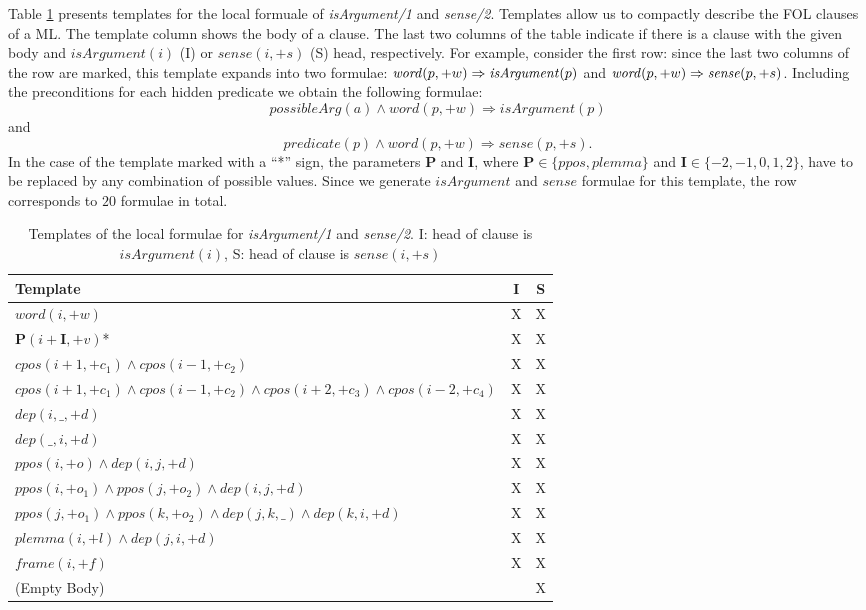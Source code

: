 Table \ref{tbl:f1} presents templates for the local formuale of 
\emph{isArgument/1} and \emph{sense/2}. Templates allow us to compactly describe the 
FOL clauses of a ML. The template column shows the body of a clause. The last two columns of the table indicate if there is a clause with the given body and $isArgument(i)$ (I) or  $sense(i,+s)$ (S) head, respectively. For example, consider the first row: 
since the last two columns of the row are marked, this template expands into two 
formulae:
$\mathit{word}(p,+w) \Rightarrow \mathit{isArgument}(p)$ and $\mathit{word}(p,+w) \Rightarrow \mathit{sense}(p,+s)$.  
Including the preconditions for each hidden predicate we obtain the following 
formulae:
\[\mathit{possibleArg}(a) \land \mathit{word}(p,+w) \Rightarrow \mathit{isArgument}(p)\] and \[predicate(p) 
\land word(p,+w) \Rightarrow sense(p,+s).\]  In the case of the template marked 
with a ``*'' sign, the parameters $\mathbf{P}$ and $\mathbf{I}$, where $\mathbf{P} \in \{ppos,plemma\}$ and 
$\mathbf{I} \in \{-2,-1,0,1,2\}$, have to be replaced by any combination of possible values. Since we generate 
$isArgument$ and $sense$ formulae for this template, the row corresponds to $20$ formulae in total.
\begin{table}
\centering
\begin{tabular}{|p{6cm}|c|c|}\hline
   Template       & I & S \\\hline
   $ word(i,+w)$  & X & X \\
   $ \mathbf{P}(i+\mathbf{I},+v)$*  & X & X \\
   $ cpos(i+1,+c_1) \land cpos(i-1,+c_2)$ & X & X\\
   $ cpos(i+1,+c_1) \land cpos(i-1,+c_2) \land cpos(i+2,+c_3) \land 
   cpos(i-2,+c_4)$ & X & X\\
   $ dep(i,\_,+d)$ & X & X\\
   $ dep(\_,i,+d)$ & X & X\\
   $ ppos(i,+o)  \land dep(i,j,+d)$ & X & X \\
   $ ppos(i,+o_1)  \land ppos(j,+o_2) \land dep(i,j,+d)$ & X & X \\
   $ ppos(j,+o_1)  \land ppos(k,+o_2) \land dep(j,k,\_) \land dep(k,i,+d)$ & X & 
   X \\
   $ plemma(i,+l) \land dep(j,i,+d)$ & X & X\\
   $ frame(i,+f)$ & X & X\\
   (Empty Body)             &   & X \\
\hline
\end{tabular}
\caption{Templates of the local formulae for \emph{isArgument/1} and 
\emph{sense/2}. I: head of clause is $isArgument(i)$, S: head of clause is 
$sense(i,+s)$}
\label{tbl:f1}
\end{table}

